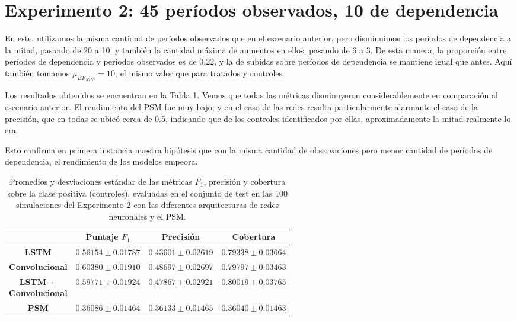 \documentclass[../../main.tex]{subfiles}
\begin{document}
\section{Experimento 2: 45 períodos observados, 10 de dependencia} \label{sec:exp2}
En este, utilizamos la misma cantidad de períodos observados que en el escenario anterior,
pero disminuimos los períodos de dependencia a la mitad, pasando de 20 a 10, y también la
cantidad máxima de aumentos en ellos, pasando de 6 a 3. De esta manera, la proporción
entre períodos de dependencia y períodos observados es de 0.22, y la de subidas sobre
períodos de dependencia se mantiene igual que antes. Aquí también tomamos
\(\mu_{{EF}_{NiNi}} = 10\), el mismo valor que para tratados y controles.

Los resultados obtenidos se encuentran en la Tabla \ref{tab:results_exp2}. Vemos que todas
las métricas disminuyeron considerablemente en comparación al escenario anterior. El
rendimiento del PSM fue muy bajo; y en el caso de las redes resulta particularmente
alarmante el caso de la precisión, que en todas se ubicó cerca de 0.5, indicando que de
los controles identificados por ellas, aproximadamente la mitad realmente lo era.

Esto confirma en primera instancia nuestra hipótesis que con la misma cantidad de
observaciones pero menor cantidad de períodos de dependencia, el rendimiento de los
modelos empeora.

\begin{table}[H]
    \centering
    \renewcommand{\arraystretch}{1.2}
    \begin{tabular}{|c|c|c|c|}
        \hline
         & \textbf{Puntaje} \(F_1\) & \textbf{Precisión} & \textbf{Cobertura} \\ \hline\hline
        \textbf{LSTM}
            & $0.56154 \pm 0.01787$ & $0.43601 \pm 0.02619$ & $0.79338 \pm 0.03664$ \\ \hline
        \textbf{Convolucional}
            & $\mathbf{0.60380 \pm 0.01910}$ & $\mathbf{0.48697 \pm 0.02697}$ & $0.79797 \pm 0.03463$ \\ \hline
        \makecell{\textbf{LSTM +} \\ \textbf{Convolucional}}
            & $0.59771 \pm 0.01924$ & $0.47867 \pm 0.02921$ & $\mathbf{0.80019 \pm 0.03765}$ \\ \hline
        \textbf{PSM}
            & $0.36086 \pm 0.01464$ & $0.36133 \pm 0.01465$ & $0.36040 \pm 0.01463$ \\
        \hline
    \end{tabular}
    \caption{Promedios y desviaciones estándar de las métricas \(F_1\), precisión y
    cobertura sobre la clase positiva (controles), evaluadas en el conjunto de test en las
    100 simulaciones del Experimento 2 con las diferentes arquitecturas de redes
    neuronales y el PSM.}
    \label{tab:results_exp2}
\end{table}
\end{document}
